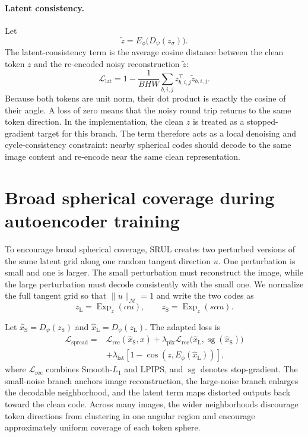 \documentclass{article}
\begin{document}
\paragraph{Latent consistency.}
Let
\begin{equation}
 \tilde z=E_\phi\big(D_\psi(z_\sigma)\big).
\end{equation}
The latent-consistency term is the average cosine distance between the clean token $z$ and the re-encoded noisy reconstruction $\tilde z$:
\begin{equation}
 \mathcal L_{\mathrm{lat}}
 =1-\frac{1}{BHW}\sum_{b,i,j}z_{b,i,j}^{\top}\tilde z_{b,i,j}.
\end{equation}
Because both tokens are unit norm, their dot product is exactly the cosine of their angle. A loss of zero means that the noisy round trip returns to the same token direction. In the implementation, the clean $z$ is treated as a stopped-gradient target for this branch. The term therefore acts as a local denoising and cycle-consistency constraint: nearby spherical codes should decode to the same image content and re-encode near the same clean representation.


\section{Broad spherical coverage during autoencoder training}
\label{app:uniform}
To encourage broad spherical coverage, SRUL creates two perturbed versions of the same latent grid along one random tangent direction $u$. One perturbation is small and one is larger. The small perturbation must reconstruct the image, while the large perturbation must decode consistently with the small one. We normalize the full tangent grid so that $\|u\|_{\mathcal M}=1$ and write the two codes as
\begin{equation}
 z_{\mathrm{L}}=\operatorname{Exp}_{z}(\alpha u),\qquad
 z_{\mathrm{S}}=\operatorname{Exp}_{z}(s\alpha u).
\end{equation}

Let $\hat x_{\mathrm{S}}=D_\psi(z_{\mathrm{S}})$ and $\hat x_{\mathrm{L}}=D_\psi(z_{\mathrm{L}})$. The adapted loss is
\begin{align}
 \mathcal L_{\mathrm{spread}}={}&
 \mathcal L_{\mathrm{rec}}(\hat x_{\mathrm{S}},x)
 +\lambda_{\mathrm{pix}}\mathcal L_{\mathrm{rec}}
 \big(\hat x_{\mathrm{L}},\operatorname{sg}(\hat x_{\mathrm{S}})\big)\\
 &+\lambda_{\mathrm{lat}}
 \left[1-\cos\!\left(z,E_\phi(\hat x_{\mathrm{L}})\right)\right],
\end{align}
where $\mathcal L_{\mathrm{rec}}$ combines Smooth-$L_1$ and LPIPS, and $\operatorname{sg}$ denotes stop-gradient. The small-noise branch anchors image reconstruction, the large-noise branch enlarges the decodable neighborhood, and the latent term maps distorted outputs back toward the clean code. Across many images, the wider neighborhoods discourage token directions from clustering in one angular region and encourage approximately uniform coverage of each token sphere.
\end{document}
